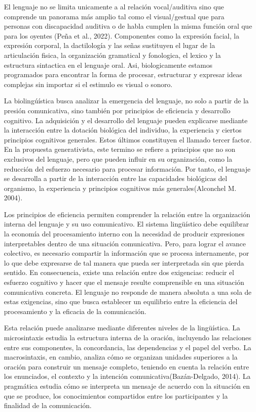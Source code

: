 \documentclass[12pt]{article}
\begin{document}
El lenguaje no se limita unicamente a al relación vocal/auditiva sino que comprende un panorama más amplio tal como el visual/gestual que para personas con discapacidad auditiva o de habla cumplen la misma función oral que para los oyentes (Peña et al., 2022). Componentes como la expresión facial, la expresión corporal, la dactilología y las señas sustituyen el lugar de la articulación fisica, la organización gramatical y fonologica, el lexico y la estructura sintactica en el lenguaje oral. Asi, biologicamente estamos programados para encontrar la forma de procesar, estructurar y expresar ideas complejas sin importar si el estimulo es visual o sonoro.

La biolingúística busca analizar la emergencia del lenguaje, no solo a partir de la presión comunicativa, sino también por principios de eficiencia y desarrollo cognitivo. La adquisición y el desarrollo del lenguaje pueden explicarse mediante la interacción entre la dotación biológica del individuo, la experiencia y ciertos principios cognitivos generales. Estos últimos constituyen el llamado tercer factor. En la propuesta generativista, este termino se refiere a principios que no son exclusivos del lenguaje, pero que pueden influir en su organización, como la reducción del esfuerzo necesario para procesar información. Por tanto, el lenguaje se desarrolla a partir de la interacción entre las capacidades biológicas del organismo, la experiencia y principios cognitivos más generales(Alconchel M. 2004).

Los principios de eficiencia permiten comprender la relación entre la organización interna del lenguaje y su uso comunicativo. El sistema lingüístico debe equilibrar la economía del procesamiento interno con la necesidad de producir expresiones interpretables dentro de una situación comunicativa. Pero, para lograr el avance colectivo, es necesario compartir la información que se procesa internamente, por lo que debe expresarse de tal manera que pueda ser interpretada sin que pierda sentido. En consecuencia, existe una relación entre dos exigencias: reducir el esfuerzo cognitivo y hacer que el mensaje resulte comprensible en una situación comunicativa concreta. El lenguaje no responde de manera absoluta a una sola de estas exigencias, sino que busca establecer un equilibrio entre la eficiencia del procesamiento y la eficacia de la comunicación.

Esta relación puede analizarse mediante diferentes niveles de la lingüística. La microsintaxis estudia la estructura interna de la oración, incluyendo las relaciones entre sus componentes, la concordancia, las dependencias y el papel del verbo. La macrosintaxis, en cambio, analiza cómo se organizan unidades superiores a la oración para construir un mensaje completo, teniendo en cuenta la relación entre los enunciados, el contexto y la intención comunicativa(Bazán-Delgado, 2014). La pragmática estudia cómo se interpreta un mensaje de acuerdo con la situación en que se produce, los conocimientos compartidos entre los participantes y la finalidad de la comunicación.
\end{document}
